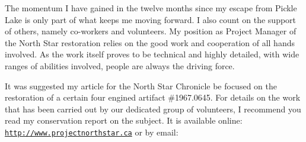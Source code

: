 The momentum I have gained in the twelve months since my escape from
Pickle Lake is only part of what keeps me moving forward. I also count
on the support of others, namely co-workers and volunteers. My position
as Project Manager of the North Star restoration relies on the good
work and cooperation of all hands involved. As the work itself proves
to be technical and highly detailed, with wide ranges of abilities
involved, people are always the driving force.

It was suggested my article for the North Star Chronicle be focused on
the restoration of a certain four engined artifact \#1967.0645. For
details on the work that has been carried out by our dedicated group of
volunteers, I recommend you read my conservation report on the subject.
It is available online: \textcolor{blue}{\texttt{\url{http://www.projectnorthstar.ca}}}
or by email: \textcolor{blue}{}


